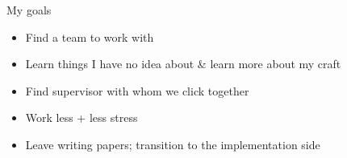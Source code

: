 \begin{frame}{My goals}

  \begin{itemize}
    \item Find a team to work with
    \item Learn things I have no idea about \& learn more about my craft
    \item Find supervisor with whom we click together
    \item Work less + less stress
    \item Leave writing papers; transition to the implementation side
  \end{itemize}

\end{frame}
